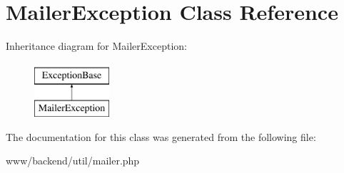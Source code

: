 \hypertarget{classMailerException}{
\section{MailerException Class Reference}
\label{classMailerException}
}
Inheritance diagram for MailerException:\begin{figure}[H]
\begin{center}
\leavevmode
\includegraphics[height=2.000000cm]{classMailerException}
\end{center}
\end{figure}


The documentation for this class was generated from the following file:\begin{DoxyCompactItemize}
\item 
www/backend/util/mailer.php\end{DoxyCompactItemize}
